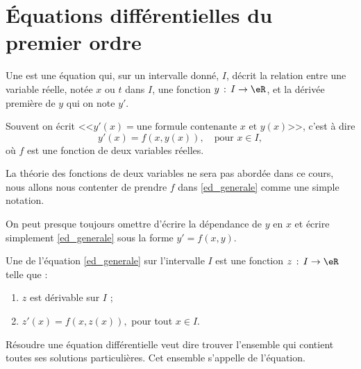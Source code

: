 
\section{Équations différentielles du premier ordre}

\begin{definition}
Une   est une équation qui, sur un intervalle donné, \(I\), décrit la relation entre une variable réelle, notée \(x\) ou \(t\) dans \(I\), une fonction \(y \,:\,I\to\eR \), et la dérivée première de \(y\) qui on note \(y'\).
\end{definition}
Souvent on écrit <<\(y'(x) = \text{une formule contenante }x \text{ et }y(x)\)>>, c'est \`a dire
\begin{equation}\label{ed_generale}
  y'(x) = f(x,y(x)),\quad\text{pour }x\in I,
\end{equation}
où \(f\) est une fonction de deux variables réelles.
\begin{remark}
  La théorie des fonctions de deux variables ne sera pas abordée dans ce cours, nous allons nous contenter de prendre \(f\) dans \eqref{ed_generale} comme une simple notation.
\end{remark}
On peut presque toujours omettre d'écrire la dépendance de \(y\) en \(x\) et écrire simplement \eqref{ed_generale} sous la forme \(y' = f(x,y)\).
\begin{definition}
  Une  de l'équation \eqref{ed_generale} sur l'intervalle \(I\) est une fonction \(z\,:\, I\to\eR\) telle que :
  \begin{enumerate}
  \item \(z\) est dérivable sur \(I\) ;
  \item \(z'(x) = f(x, z(x)), \) pour tout \(x\in I\).
  \end{enumerate}
\end{definition}
\begin{definition}
  Résoudre une équation différentielle veut dire trouver l'ensemble qui contient toutes ses solutions particulières. Cet ensemble s'appelle  de l'équation.
\end{definition}
